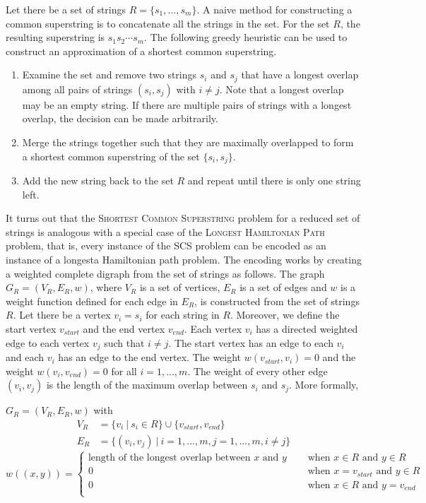 \documentclass[english,twoside,censored,csm,algorithms-track-2020]{HYthesisML}
\theoremstyle{plain}
\theoremstyle{definition}
\begin{document}
Let there be a set of strings $R=\{s_1,...,s_m\}$. A naive method for constructing a common superstring
is to concatenate all the strings in the set. For the set $R$, the resulting superstring
is $s_1s_2\cdots s_m$.
The following greedy heuristic can be used to construct an approximation of a shortest
common superstring.

\begin{enumerate}
\item Examine the set and remove two strings $s_i$ and $s_j$ that have a longest overlap among all pairs of strings $(s_i, s_j)$ with $i\neq j$. Note that a longest overlap may be an empty string. If there are multiple pairs of strings with a longest overlap, the decision can be made arbitrarily.
\item Merge the strings together such that they are maximally overlapped to form a shortest common superstring of the set $\{s_i, s_j\}$.
  \item Add the new string back to the set $R$ and repeat until there is only one string left.
\end{enumerate}

It turns out that the \textsc{Shortest Common Superstring} problem for a reduced set of strings is
analogous with a special case of
the \textsc{Longest Hamiltonian Path} problem, that is, every instance of the SCS problem can be encoded
as an instance of a longesta Hamiltonian path problem. The encoding works by creating a weighted
complete digraph from the set of strings as follows. 
The graph $G_R=(V_R,E_R,w)$, where $V_R$ is a set of vertices, $E_R$ is a set of edges and $w$ is a
 weight function defined for each edge in $E_R$, is constructed from the set of strings $R$.
Let there be a vertex $v_i=s_i$ for each string in $R$. Moreover, we define the start vertex
$v_{start}$ and the end vertex $v_{end}$. Each vertex $v_i$ has a directed weighted edge to each vertex
$v_j$ such that $i\neq j$. The start vertex has an edge to each $v_i$ and each $v_i$ has an edge to the
end vertex. The weight $w(v_{start}, v_i) = 0$ and the weight $w(v_i, v_{end}) = 0$ for all $i=1,...,m$.
The weight of every other edge $(v_i, v_j)$ is the length of the maximum overlap between $s_i$ and $s_j$.
More formally,

$G_R=(V_R,E_R,w)$ with
\begin{align*}
  V_R &= \{v_i~|~s_i\in R\} \cup \{v_{start},v_{end}\} \\
  E_R &= \{(v_i,v_j)~|~i=1,...,m, j=1,...,m, i\neq j\}
\end{align*}
\[   
w((x,y)) = 
     \begin{cases}
       \text{length of the longest overlap between } x \text{ and } y &\quad\text{ when } x\in R \text{ and } y\in R  \\
       0 &\quad\text{ when } x=v_{start} \text{ and } y\in R \\
       0 &\quad\text{ when } x\in R \text{ and } y=v_{end} \\
     \end{cases}
     \]
\end{document}
